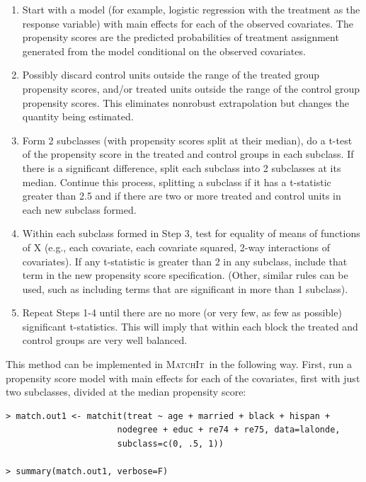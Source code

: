 \documentclass[oneside,letterpaper,titlepage]{article}
\newcommand{\MatchIt}{\textsc{MatchIt}}
\begin{document}
\begin{enumerate}
\item Start with a model (for example, logistic regression with the
  treatment as the response variable) with main effects for each of
  the observed covariates.  The propensity scores are the predicted
  probabilities of treatment assignment generated from the model
  conditional on the observed covariates.
\item Possibly discard control units outside the range of the treated
  group propensity scores, and/or treated units outside the range of
  the control group propensity scores.  This eliminates nonrobust
  extrapolation but changes the quantity being estimated.
\item Form 2 subclasses (with propensity scores split at their
  median), do a t-test of the propensity score in the treated and
  control groups in each subclass.  If there is a significant
  difference, split each subclass into 2 subclasses at its median.
  Continue this process, splitting a subclass if it has a t-statistic
  greater than 2.5 and if there are two or more treated and control
  units in each new subclass formed.
\item Within each subclass formed in Step 3, test for equality of
  means of functions of X (e.g., each covariate, each covariate
  squared, 2-way interactions of covariates).  If any t-statistic is
  greater than 2 in any subclass, include that term in the new
  propensity score specification.  (Other, similar rules can be used,
  such as including terms that are significant in more than 1
  subclass).
\item Repeat Steps 1-4 until there are no more (or very few, as few as
  possible) significant t-statistics.  This will imply that within
  each block the treated and control groups are very well balanced.
\end{enumerate}

This method can be implemented in \MatchIt\ in the following way.
First, run a propensity score model with main effects for each of the
covariates, first with just two subclasses, divided at the median
propensity score:

\begin{verbatim}
> match.out1 <- matchit(treat ~ age + married + black + hispan +
                      nodegree + educ + re74 + re75, data=lalonde,                      
                      subclass=c(0, .5, 1))

> summary(match.out1, verbose=F)
\end{verbatim}
\end{document}
